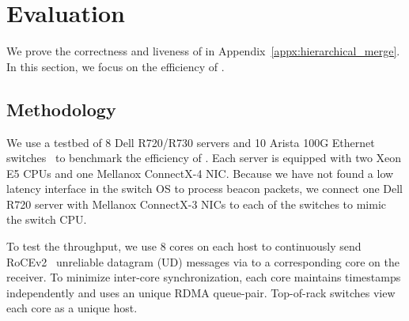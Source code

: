 \section{Evaluation}
\label{sec:evaluation}

We prove the correctness and liveness of \sys in Appendix~\ref{appx:hierarchical_merge}.
In this section, we focus on the efficiency of \sys.

\subsection{Methodology}
\label{sec:testbed}

We use a testbed of 8 Dell R720/R730 servers and 10 Arista 100G Ethernet switches~\cite{arista} to benchmark the efficiency of \sys. %
Each server is equipped with two Xeon E5 CPUs and one Mellanox ConnectX-4 NIC. Because we have not found a low latency interface in the switch OS to process beacon packets, we connect one Dell R720 server with Mellanox ConnectX-3 NICs to each of the switches to mimic the switch CPU. %

To test the throughput, we use 8 cores on each host to continuously send RoCEv2~\cite{infinibandrocev2} unreliable datagram (UD) messages via \sys to a corresponding core on the receiver. To minimize inter-core synchronization, each core maintains timestamps independently and uses an unique RDMA queue-pair. Top-of-rack switches view each core as a unique host.


\begin{table}[t]
\centering
{}
\caption{Network topologies for evaluation.}
\label{tab:eval-topology}
\end{table}


